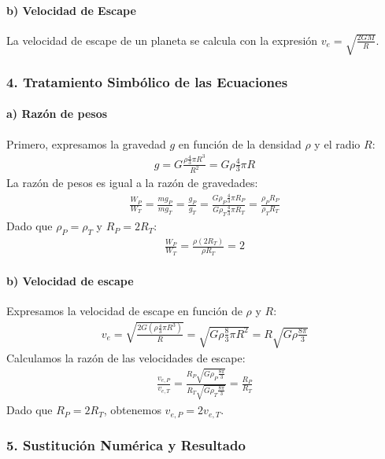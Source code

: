 \paragraph*{b) Velocidad de Escape}
La velocidad de escape de un planeta se calcula con la expresión $v_e = \sqrt{\frac{2GM}{R}}$.

\subsubsection*{4. Tratamiento Simbólico de las Ecuaciones}
\paragraph*{a) Razón de pesos}
Primero, expresamos la gravedad $g$ en función de la densidad $\rho$ y el radio $R$:
\begin{gather}
    g = G \frac{\rho \frac{4}{3}\pi R^3}{R^2} = G \rho \frac{4}{3}\pi R
\end{gather}
La razón de pesos es igual a la razón de gravedades:
\begin{gather}
    \frac{W_P}{W_T} = \frac{m g_P}{m g_T} = \frac{g_P}{g_T} = \frac{G \rho_P \frac{4}{3}\pi R_P}{G \rho_T \frac{4}{3}\pi R_T} = \frac{\rho_P R_P}{\rho_T R_T}
\end{gather}
Dado que $\rho_P = \rho_T$ y $R_P = 2 R_T$:
\begin{gather}
    \frac{W_P}{W_T} = \frac{\rho (2R_T)}{\rho R_T} = 2
\end{gather}
\paragraph*{b) Velocidad de escape}
Expresamos la velocidad de escape en función de $\rho$ y $R$:
\begin{gather}
    v_e = \sqrt{\frac{2G(\rho \frac{4}{3}\pi R^3)}{R}} = \sqrt{G\rho \frac{8}{3}\pi R^2} = R \sqrt{G\rho \frac{8\pi}{3}}
\end{gather}
Calculamos la razón de las velocidades de escape:
\begin{gather}
    \frac{v_{e,P}}{v_{e,T}} = \frac{R_P \sqrt{G\rho_P \frac{8\pi}{3}}}{R_T \sqrt{G\rho_T \frac{8\pi}{3}}} = \frac{R_P}{R_T}
\end{gather}
Dado que $R_P = 2 R_T$, obtenemos $v_{e,P} = 2 v_{e,T}$.

\subsubsection*{5. Sustitución Numérica y Resultado}
